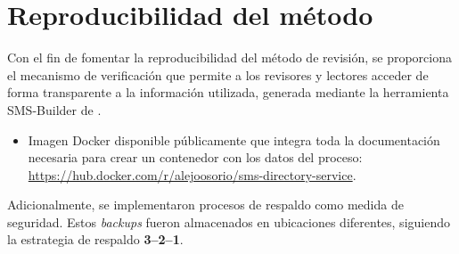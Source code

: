 \section{Reproducibilidad del método}

Con el fin de fomentar la reproducibilidad del método de revisión, se proporciona el mecanismo de verificación que permite a los revisores y lectores acceder de forma transparente a la información utilizada, generada mediante la herramienta \acs{SMS}-Builder de \citet{SMSBuilder2020}.

\begin{itemize}
	\item Imagen Docker disponible públicamente que integra toda la documentación necesaria para crear un contenedor con los datos del proceso:
	      \url{https://hub.docker.com/r/alejoosorio/sms-directory-service}.
\end{itemize}

\noindent
Adicionalmente, se implementaron procesos de respaldo como medida de seguridad. Estos \textit{backups} fueron almacenados en ubicaciones diferentes, siguiendo la estrategia de respaldo \textbf{3--2--1}.
